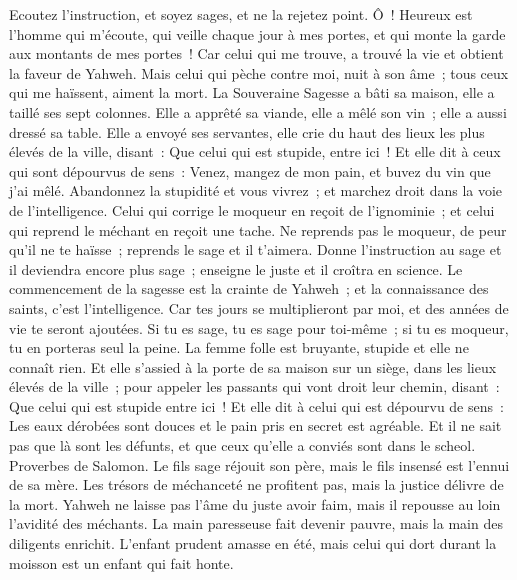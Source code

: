 \begin{multicols}{2}
Ecoutez l'instruction, et soyez sages, et ne la rejetez point.
Ô~! Heureux est l'homme qui m'écoute, qui veille chaque jour à mes portes, et qui monte la garde aux montants de mes portes~!
Car celui qui me trouve, a trouvé la vie et obtient la faveur de Yahweh.
Mais celui qui pèche contre moi, nuit à son âme~; tous ceux qui me haïssent, aiment la mort.
\VerseOne{}La Souveraine Sagesse a bâti sa maison, elle a taillé ses sept colonnes.
Elle a apprêté sa viande, elle a mêlé son vin~; elle a aussi dressé sa table.
Elle a envoyé ses servantes, elle crie du haut des lieux les plus élevés de la ville, disant~:
Que celui qui est stupide, entre ici~! Et elle dit à ceux qui sont dépourvus de sens~:
Venez, mangez de mon pain, et buvez du vin que j'ai mêlé.
Abandonnez la stupidité et vous vivrez~; et marchez droit dans la voie de l'intelligence.
Celui qui corrige le moqueur en reçoit de l'ignominie~; et celui qui reprend le méchant en reçoit une tache.
Ne reprends pas le moqueur, de peur qu'il ne te haïsse~; reprends le sage et il t'aimera.
Donne l'instruction au sage et il deviendra encore plus sage~; enseigne le juste et il croîtra en science.
Le commencement de la sagesse est la crainte de Yahweh~; et la connaissance des saints, c'est l'intelligence.
Car tes jours se multiplieront par moi, et des années de vie te seront ajoutées.
Si tu es sage, tu es sage pour toi-même~; si tu es moqueur, tu en porteras seul la peine.
La femme folle est bruyante, stupide et elle ne connaît rien.
Et elle s'assied à la porte de sa maison sur un siège, dans les lieux élevés de la ville~;
pour appeler les passants qui vont droit leur chemin, disant~:
Que celui qui est stupide entre ici~! Et elle dit à celui qui est dépourvu de sens~:
Les eaux dérobées sont douces et le pain pris en secret est agréable.
Et il ne sait pas que là sont les défunts, et que ceux qu'elle a conviés sont dans le scheol.
\VerseOne{}Proverbes de Salomon. Le fils sage réjouit son père, mais le fils insensé est l'ennui de sa mère.
Les trésors de méchanceté ne profitent pas, mais la justice délivre de la mort.
Yahweh ne laisse pas l'âme du juste avoir faim, mais il repousse au loin l'avidité des méchants.
La main paresseuse fait devenir pauvre, mais la main des diligents enrichit.
L'enfant prudent amasse en été, mais celui qui dort durant la moisson est un enfant qui fait honte.

\end{multicols}
